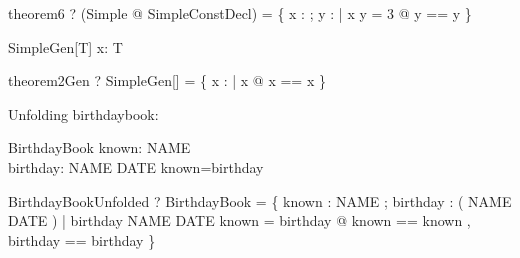 \begin{theorem}{theorem6}
  \vdash? (\exists Simple @ SimpleConstDecl) =
    \{ x : \arithmos ; y : \arithmos |
       x \in \nat \land y = 3 @ \lblot y == y \rblot \}
\end{theorem}


\begin{schema}{SimpleGen}[T]
  x: T
\end{schema}

\begin{theorem}{theorem2Gen}
  \vdash? SimpleGen[\nat] =
    \{ x : \arithmos | x \in \nat @ \lblot x == x \rblot \}
\end{theorem}




Unfolding birthdaybook:

\begin{zed}\end{zed}

\begin{schema}{BirthdayBook}
    known: \power NAME \\
    birthday: NAME \pfun DATE
\where
    known=\dom birthday
\end{schema}

\begin{theorem}{BirthdayBookUnfolded}
  \vdash? BirthdayBook =
    \{ known : \power NAME ; birthday : \power ( NAME \cross DATE ) |
        birthday \in NAME \pfun DATE \land known = \dom birthday @
    \lblot known == known , birthday == birthday \rblot \}
\end{theorem}
